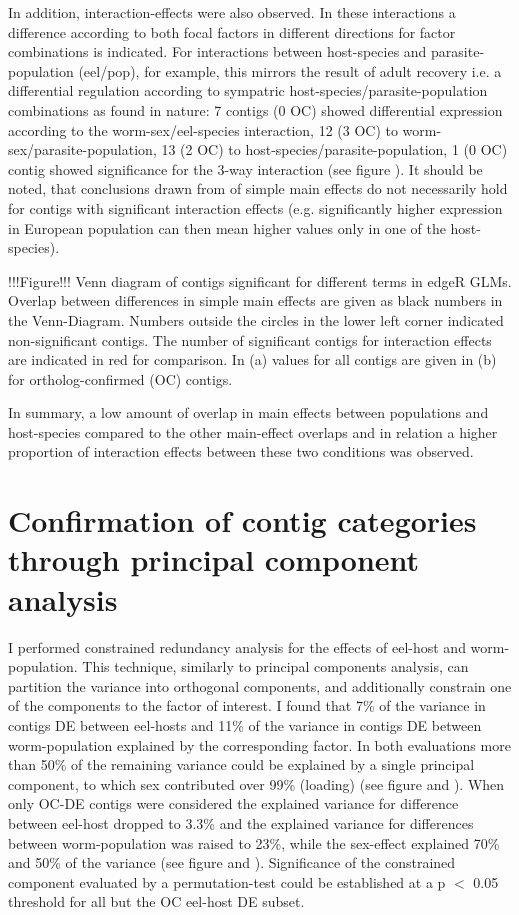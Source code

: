 \documentclass[10pt]{article}
\begin{document}
In addition, interaction-effects were also observed. In these
interactions a difference according to both focal factors in different
directions for factor combinations is indicated. For interactions
between host-species and parasite-population (eel/pop), for example,
this mirrors the result of adult recovery i.e. a differential
regulation according to sympatric host-species/parasite-population
combinations as found in nature: 7 contigs (0 OC) showed differential
expression according to the worm-sex/eel-species interaction, 12 (3
OC) to worm-sex/parasite-population, 13 (2 OC) to
host-species/parasite-population, 1 (0 OC) contig showed significance
for the 3-way interaction (see figure ). It should be noted, that
conclusions drawn from of simple main effects do not necessarily hold
for contigs with significant interaction effects (e.g. significantly
higher expression in European population can then mean higher values
only in one of the host-species).

!!!Figure!!! Venn diagram of contigs significant for different terms
in edgeR GLMs. Overlap between differences in simple main effects are
given as black numbers in the Venn-Diagram. Numbers outside the
circles in the lower left corner indicated non-significant
contigs. The number of significant contigs for interaction effects are
indicated in red for comparison. In (a) values for all contigs are
given in (b) for ortholog-confirmed (OC) contigs.

In summary, a low amount of overlap in main effects between
populations and host-species compared to the other main-effect
overlaps and in relation a higher proportion of interaction effects
between these two conditions was observed.

\section{Confirmation of contig categories through principal component
  analysis}

I performed constrained redundancy analysis for the effects of
eel-host and worm-population. This technique, similarly to principal
components analysis, can partition the variance into orthogonal
components, and additionally constrain one of the components to the
factor of interest. I found that 7\% of the variance in contigs DE
between eel-hosts and 11\% of the variance in contigs DE between
worm-population explained by the corresponding factor. In both
evaluations more than 50\% of the remaining variance could be
explained by a single principal component, to which sex contributed
over 99\% (loading) (see figure and ). When only OC-DE contigs were
considered the explained variance for difference between eel-host
dropped to 3.3\% and the explained variance for differences between
worm-population was raised to 23\%, while the sex-effect explained
70\% and 50\% of the variance (see figure and ). Significance of the
constrained component evaluated by a permutation-test could be
established at a p $<$ 0.05 threshold for all but the OC eel-host DE
subset.
\end{document}
